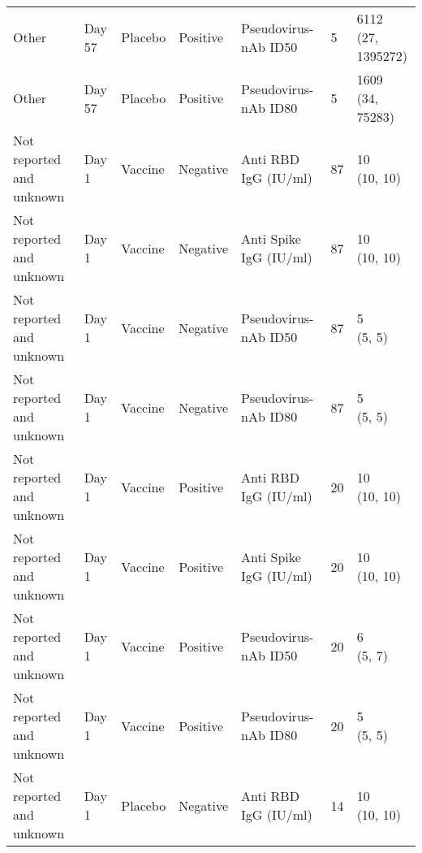 \documentclass[]{book}
\theoremstyle{definition}
\theoremstyle{definition}
\theoremstyle{definition}
\newcommand{\1}{\mathbbm{1}}
\begin{document}
\begin{landscape}
\begin{ThreePartTable}
\begin{longtable}[t]{>{\raggedright\arraybackslash}p{7cm}llllll}
\hspace{1em}Other & Day 57 & Placebo & Positive & Pseudovirus-nAb ID50 & 5 & \makecell[l]{6112\\(27, 1395272)}\\
\hspace{1em}Other & Day 57 & Placebo & Positive & Pseudovirus-nAb ID80 & 5 & \makecell[l]{1609\\(34, 75283)}\\
\hspace{1em}Not reported and unknown & Day 1 & Vaccine & Negative & Anti RBD IgG (IU/ml) & 87 & \makecell[l]{10\\(10, 10)}\\
\hspace{1em}Not reported and unknown & Day 1 & Vaccine & Negative & Anti Spike IgG (IU/ml) & 87 & \makecell[l]{10\\(10, 10)}\\
\hspace{1em}Not reported and unknown & Day 1 & Vaccine & Negative & Pseudovirus-nAb ID50 & 87 & \makecell[l]{5\\(5, 5)}\\
\hspace{1em}Not reported and unknown & Day 1 & Vaccine & Negative & Pseudovirus-nAb ID80 & 87 & \makecell[l]{5\\(5, 5)}\\
\hspace{1em}Not reported and unknown & Day 1 & Vaccine & Positive & Anti RBD IgG (IU/ml) & 20 & \makecell[l]{10\\(10, 10)}\\
\hspace{1em}Not reported and unknown & Day 1 & Vaccine & Positive & Anti Spike IgG (IU/ml) & 20 & \makecell[l]{10\\(10, 10)}\\
\hspace{1em}Not reported and unknown & Day 1 & Vaccine & Positive & Pseudovirus-nAb ID50 & 20 & \makecell[l]{6\\(5, 7)}\\
\hspace{1em}Not reported and unknown & Day 1 & Vaccine & Positive & Pseudovirus-nAb ID80 & 20 & \makecell[l]{5\\(5, 5)}\\
\hspace{1em}Not reported and unknown & Day 1 & Placebo & Negative & Anti RBD IgG (IU/ml) & 14 & \makecell[l]{10\\(10, 10)}\\

\end{longtable}
\end{ThreePartTable}
\end{landscape}
\end{document}
